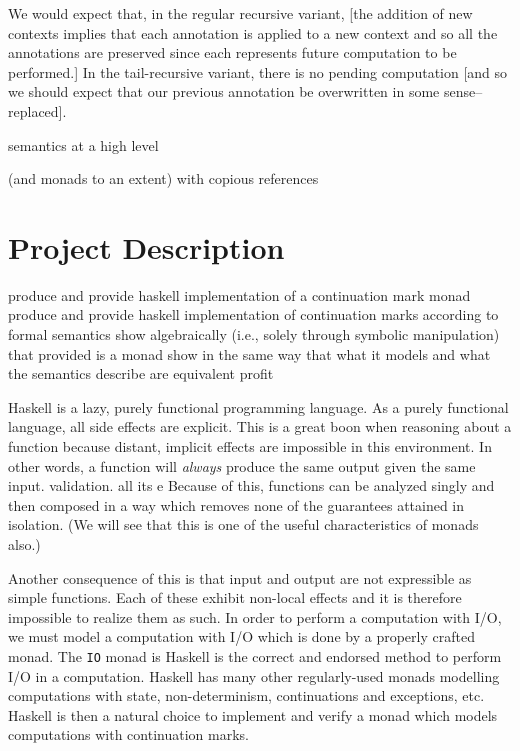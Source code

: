 \documentclass[ms]{byuprop} %
\begin{document}
We would expect that, in the regular recursive variant, [the addition of new contexts
implies that each annotation is applied to a new context and so all the annotations are
preserved since each represents future computation to be performed.] In the tail-recursive
variant, there is no pending computation [and so we should expect that our previous
annotation be overwritten in some sense--replaced].


semantics at a high level



(and monads to an extent) with copious references

\section{Project Description}

produce and provide haskell implementation of a continuation mark monad produce and
provide haskell implementation of continuation marks according to formal semantics show
algebraically (i.e., solely through symbolic manipulation) that provided is a monad show
in the same way that what it models and what the semantics describe are equivalent profit

Haskell \cite{hudak1992report} is a lazy, purely functional programming language. As a
purely functional language, all side effects are explicit. This is a great boon when
reasoning about a function because distant, implicit effects are impossible in this
environment. In other words, a function will \emph{always} produce the same output given
the same input. %
validation. all its e Because of this, functions can be analyzed singly and then composed
in a way which removes none of the guarantees attained in isolation. (We will see that
this is one of the useful characteristics of monads also.)

Another consequence of this is that input and output are not expressible as simple
functions. Each of these exhibit non-local effects and it is therefore impossible to
realize them as such. In order to perform a computation with I/O, we must model a
computation with I/O which is done by a properly crafted monad. The \texttt{IO} monad is
Haskell is the correct and endorsed method to perform I/O in a computation. Haskell has
many other regularly-used monads modelling computations with state, non-determinism,
continuations and exceptions, etc. Haskell is then a natural choice to implement and
verify a monad which models computations with continuation marks.
\end{document}
